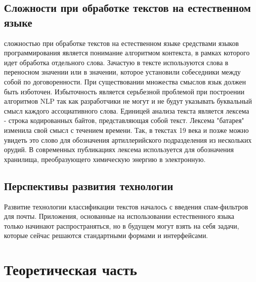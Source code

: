 \documentclass{article}
\newcommand\tab[1][1cm]{\hspace*{#1}}
\begin{document}
\subsection{Сложности при обработке текстов на естественном языке}
 сложностью при обработке текстов на естественном языке средствами языков программирования является понимание алгоритмом контекста, в рамках которого идет обработка отдельного слова. Зачастую в тексте используются слова в переносном значении или в значении, которое установили собеседники между собой по договоренности. При существовании множества смыслов язык должен быть изботочен. Избыточность является серьбезной проблемой при построении алгоритмов NLP так как разработчики не могут и не будут указывать буквальный смысл каждого ассоциативного слова. Единицей анализа текста является лексема - строка кодированных байтов, представляющая собой текст. Лексема "батарея" изменила свой смысл с течением времени. Так, в текстах 19 века и позже можно увидеть это слово для обозначения артиллерийского подразделения из нескольких орудий. В современных публикациях лексема используется для обозначения хранилища, преобразующего химическую энергию в электронную.
\newpage
\subsection{Перспективы развития технологии}
Развитие технологии классификации текстов началось с введения спам-фильтров для почты. Приложения, основанные на использовании естественного языка только начинают распространяться, но в будущем могут взять на себя задачи, которые сейчас решаются стандартными формами и  интерфейсами.
\newpage
\section{Теоретическая часть} 
\newpage
\end{document}
